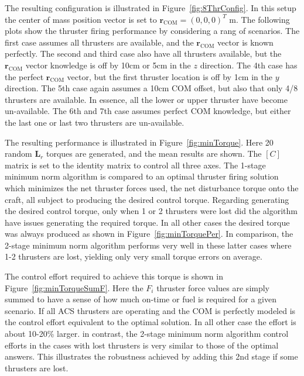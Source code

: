 \documentclass[]{BasiliskReportMemo}
\begin{document}
The resulting configuration is illustrated in Figure~\ref{fig:8ThrConfig}.  In this setup the center of mass position vector is set to $\bm r_{\text{COM}} = (0,0,0)^{T} \text{ m}$.  The following plots show the thruster firing performance by considering a rang of scenarios.  The first case assumes all thrusters are available, and the $\bm r_{\text{COM}}$ vector is known perfectly.  The second and third case also have all thrusters available, but the $\bm r_{\text{COM}}$ vector knowledge is off by 10cm or 5cm in the $z$ direction.  The 4th case has the perfect $\bm r_{\text{COM}}$ vector, but the first thruster location is off by 1cm in the $y$ direction.  The 5th case again assumes a 10cm COM offset, but also that only 4/8 thrusters are available.  In essence, all the lower or upper thruster have become un-available.  The 6th and 7th case assumes perfect COM knowledge, but either the last one or last two thrusters are un-available.  


The resulting performance is illustrated in Figure~\ref{fig:minTorque}.  Here 20 random $\bm L_{r}$ torques are generated, and the mean results are shown.  The $[C]$ matrix is set to the identity matrix to control all three axes.   The 1-stage minimum norm algorithm is compared to an optimal thruster firing solution which minimizes the net thruster forces used, the net disturbance torque onto the craft, all subject to producing the desired control torque.    Regarding generating the desired control torque, only when 1 or 2 thrusters were lost did the algorithm have issues generating the required torque.  In all other cases the desired torque was always produced as shown in Figure~\ref{fig:minTorquePer}.  In comparison, the 2-stage minimum norm algorithm performs very well in these latter cases where 1-2 thrusters are lost, yielding only very small torque errors on average.  

The control effort required to achieve this torque is shown in Figure~\ref{fig:minTorqueSumF}.  Here the $F_{i}$ thruster force values are simply summed to have a sense of how much on-time or fuel is required for a given scenario.  If all ACS thrusters are operating and the COM is perfectly modeled is the control effort equivalent to the optimal solution.  In all other case the effort is about 10-20\% larger.  in contrast, the 2-stage minimum norm algorithm control efforts in the cases with lost thrusters is very similar to those of the optimal answers.  This illustrates the robustness achieved by adding this 2nd stage if some thrusters are lost.  
\end{document}
